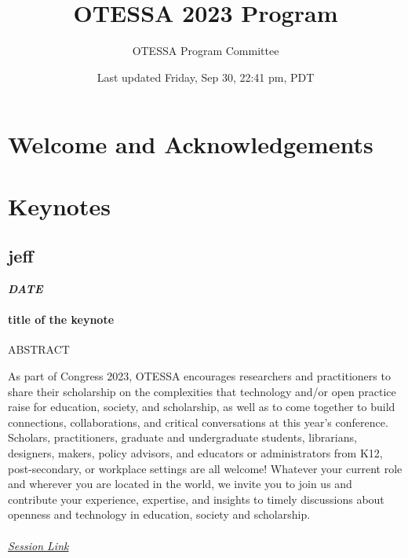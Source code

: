 \documentclass[
]{book}
\title{OTESSA 2023 Program}
\author{OTESSA Program Committee}
\date{Last updated Friday, Sep 30, 22:41 pm, PDT}
\begin{document}
\maketitle

{
\setcounter{tocdepth}{1}
\tableofcontents
}
\hypertarget{welcome-and-acknowledgements}{%
\chapter*{Welcome and Acknowledgements}\label{welcome-and-acknowledgements}}

\hypertarget{keynotes}{%
\chapter*{Keynotes}\label{keynotes}}

\hypertarget{jeff}{%
\section*{jeff}\label{jeff}}

\textbf{\emph{DATE}}

\begin{keynote}
\hypertarget{title-of-the-keynote}{%
\subsubsection{title of the keynote}\label{title-of-the-keynote}}

ABSTRACT

As part of Congress 2023, OTESSA encourages researchers and
practitioners to share their scholarship on the complexities that
technology and/or open practice raise for education, society, and
scholarship, as well as to come together to build connections,
collaborations, and critical conversations at this year's conference.
Scholars, practitioners, graduate and undergraduate students,
librarians, designers, makers, policy advisors, and educators or
administrators from K12, post-secondary, or workplace settings are all
welcome! Whatever your current role and wherever you are located in the
world, we invite you to join us and contribute your experience,
expertise, and insights to timely discussions about openness and
technology in education, society and scholarship.

\hypertarget{session-link}{%
\subparagraph{\texorpdfstring{\href{}{Session
Link}}{Session Link}}\label{session-link}}
\end{keynote}
\end{document}
